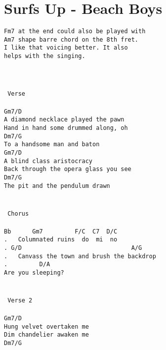 \newpage
\section{Surfs Up - Beach Boys}
\label{Surfs Up - Beach Boys}
\texttt{Fm7\ at\ the\ end\ could\ also\ be\ played\ with\ \\
Am7\ shape\ barre\ chord\ on\ the\ 8th\ fret.\\
I\ like\ that\ voicing\ better.\ It\ also\\
helps\ with\ the\ singing.\ \ \ \ \ \ \ \ \\
\\
\\
\\
\lbrack\ Verse\rbrack\\
\\
Gm7/D\\
A\ diamond\ necklace\ played\ the\ pawn\\
Hand\ in\ hand\ some\ drummed\ along,\ oh\\
Dm7/G\\
To\ a\ handsome\ man\ and\ baton\\
Gm7/D\\
A\ blind\ class\ aristocracy\\
Back\ through\ the\ opera\ glass\ you\ see\\
Dm7/G\\
The\ pit\ and\ the\ pendulum\ drawn\\
\\
\\
\lbrack\ Chorus\rbrack\\
\\
Bb\ \ \ \ \ \ Gm7\ \ \ \ \ \ \ \ \ F/C\ \ C7\ \ D/C\\
. \ \ Columnated\ ruins\ \ do\ \ mi\ \ no\\
. G/D\ \ \ \ \ \ \ \ \ \ \ \ \ \ \ \ \ \ \ \ \ \ \ \ \ \ \ \ \ \ \ A/G\\
. \ \ Canvass\ the\ town\ and\ brush\ the\ backdrop\\
. \ \ \ \ \ \ \ \ D/A\\
Are\ you\ sleeping?\\
\\
\\
\lbrack\ Verse\ 2\rbrack\\
\\
Gm7/D\\
Hung\ velvet\ overtaken\ me\\
Dim\ chandelier\ awaken\ me\\
Dm7/G\\
}
